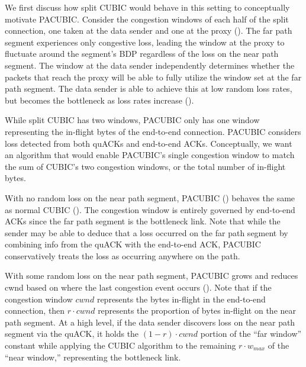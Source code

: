 We first discuss how split CUBIC would behave in this setting to conceptually
motivate PACUBIC. Consider the congestion windows of each half of the split
connection, one taken at the data sender and one at the proxy
(). The far path
segment experiences only congestive loss, leading the window at the proxy to
fluctuate around the segment's BDP regardless of the loss on the near path
segment. The window at the data sender independently determines whether the
packets that reach the proxy will be able to fully utilize the window set at
the far path segment. The data sender is able to achieve this at low random
loss rates, but becomes the bottleneck as loss rates increase
().

While split CUBIC has two windows, PACUBIC only has one
window representing the in-flight bytes of the end-to-end connection.
PACUBIC considers loss detected from both quACKs and end-to-end ACKs.
Conceptually, we want an algorithm that would enable PACUBIC's single
congestion window to match the sum of CUBIC's two congestion windows, or
the total number of in-flight bytes.

With no random loss on the near path segment, PACUBIC
() behaves the same as normal CUBIC
(). The congestion window is entirely governed
by end-to-end ACKs since the far path segment is the bottleneck link. Note that
while the sender may be able to deduce that a loss occurred on the far path
segment by combining info from the quACK with the end-to-end ACK, PACUBIC
conservatively treats the loss as occurring anywhere on the path.

With some random loss on the near path segment, PACUBIC grows and reduces cwnd
based on where the last congestion event occurs
(). Note that if the congestion window $cwnd$
represents the bytes in-flight in the end-to-end connection, then $r \cdot cwnd$
represents the proportion of bytes in-flight on the near path segment. At a
high level, if the data sender discovers loss on the near path segment via the
quACK, it holds the $(1-r)\cdot cwnd$ portion of the ``far window'' constant
while applying the CUBIC algorithm to the remaining $r \cdot w_{max}$ of the
``near window,'' representing the bottleneck link.

